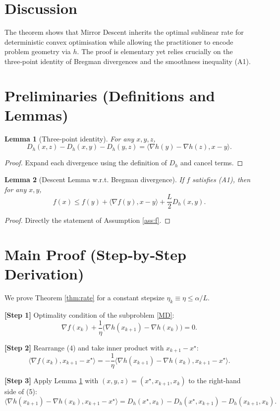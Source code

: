 \documentclass{article}
\newtheorem{lemma}{Lemma}
\newcommand{\ip}[2]{\langle #1,#2\rangle}
\newcommand{\DD}[2]{D_{h}(#1,#2)}
\newcommand{\grad}{\nabla}
\begin{document}
\section*{Discussion}
The theorem shows that Mirror Descent inherits the optimal sublinear rate for
deterministic convex optimisation while allowing the practitioner to encode
problem geometry via $h$.  The proof is elementary yet relies crucially on the
three‑point identity of Bregman divergences and the smoothness inequality (A1).

\section*{Preliminaries (Definitions and Lemmas)}
\begin{lemma}[Three‑point identity]\label{lem:3pt}
For any $x,y,z$,
\[
\DD{x}{z}-\DD{x}{y}-\DD{y}{z}
   =\ip{\grad h(y)-\grad h(z)}{x-y}.
\tag{L1}
\]
\end{lemma}
\begin{proof}
Expand each divergence using the definition of $D_h$ and cancel terms.
\end{proof}

\begin{lemma}[Descent Lemma w.r.t. Bregman divergence]\label{lem:descent}
If $f$ satisfies (A1), then for any $x,y$,
\[
f(x)\le f(y)+\ip{\grad f(y)}{x-y}+\frac{L}{2}\DD{x}{y}.
\tag{L2}
\]
\end{lemma}
\begin{proof}
Directly the statement of Assumption \ref{ass:f}.
\end{proof}

\section*{Main Proof (Step‑by‑Step Derivation)}
We prove Theorem \ref{thm:rate} for a constant stepsize
$\eta_k\equiv\eta\le\alpha/L$.

\noindent\textbf{[Step 1]}  Optimality condition of the subproblem \eqref{MD}:
\[
\grad f(x_k)+\frac1\eta\big(\grad h(x_{k+1})-\grad h(x_k)\big)=0.
\tag{4}
\]

\noindent\textbf{[Step 2]}  Rearrange (4) and take inner product with $x_{k+1}-x^{\star}$:
\[
\ip{\grad f(x_k)}{x_{k+1}-x^{\star}}
   =-\frac1\eta\ip{\grad h(x_{k+1})-\grad h(x_k)}{x_{k+1}-x^{\star}}.
\tag{5}
\]

\noindent\textbf{[Step 3]}  Apply Lemma \ref{lem:3pt} with
$(x,y,z)=(x^{\star},x_{k+1},x_k)$ to the right‑hand side of (5):
\[
\ip{\grad h(x_{k+1})-\grad h(x_k)}{x_{k+1}-x^{\star}}
   =\DD{x^{\star}}{x_k}-\DD{x^{\star}}{x_{k+1}}-\DD{x_{k+1}}{x_k}.
\tag{6}
\]
\end{document}
